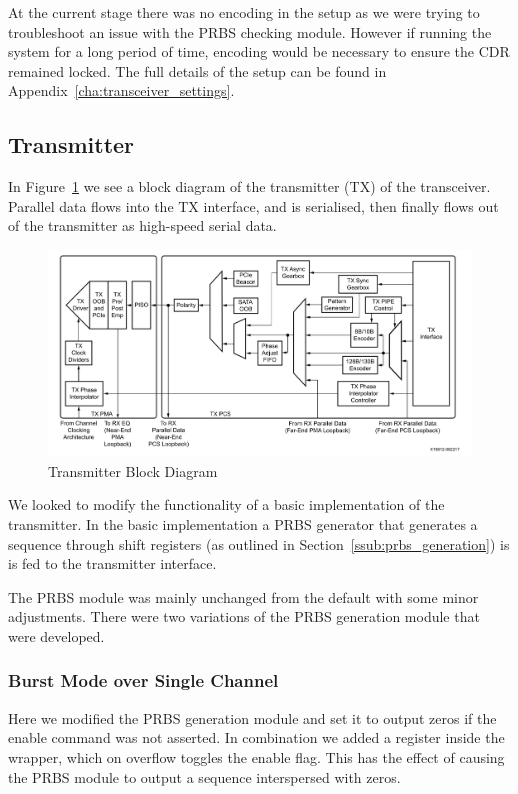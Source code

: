 At the current stage there was no encoding in the setup as we were trying to
troubleshoot an issue with the PRBS checking module. However if running the
system for a long period of time, encoding would be necessary to ensure the CDR
remained locked.
The full details of the setup can be found in
Appendix~\ref{cha:transceiver_settings}.


\subsection{Transmitter}%
\label{sub:transmitter}
In Figure~\ref{fig:transmitter_block} we see a block diagram of the transmitter
(TX) of the transceiver. Parallel data flows into the TX interface,
and is serialised, then finally flows out of the transmitter as high-speed
serial data.

\begin{figure}[ht]
    \centering
    \hspace*{-1cm}\includegraphics[width=1.2\linewidth]{img/transmitter_block.png}
    \caption{Transmitter Block Diagram~\cite{GTY_guide} }%
    \label{fig:transmitter_block}
\end{figure}

We looked to modify the functionality of a basic implementation of the
transmitter. In the basic implementation a PRBS generator that generates a
sequence through shift registers (as outlined in
Section~\ref{ssub:prbs_generation}) is is fed to the transmitter interface. 

The PRBS module was mainly unchanged from the default with some minor
adjustments.  There were two variations of the PRBS generation module that were
developed.

\subsubsection{Burst Mode over Single Channel}%
\label{ssub:burst_mode_over_single_channel}
Here we modified the PRBS generation module and set it to output zeros if the
enable command was not asserted.  In combination we added a register
inside the wrapper, which on overflow toggles the enable flag. This has the
effect of causing the PRBS module to output a sequence interspersed with zeros.

